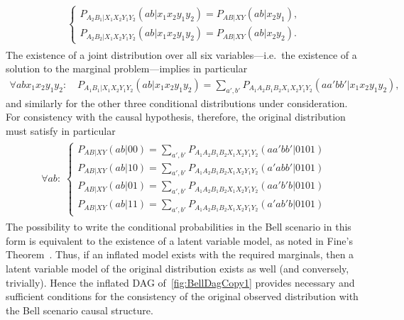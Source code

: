 {\begin{align}
\begin{split}
\begin{cases}
	P_{A_2 B_1 | X_1 X_2 Y_1 Y_2}(a b | x_1 x_2 y_1 y_2)  = P_{A B | X Y}(a b | x_2 y_1), \\
	P_{A_2 B_2 | X_1 X_2 Y_1 Y_2}(a b | x_1 x_2 y_1 y_2)  = P_{A B | X Y}(a b | x_2 y_2).
\end{cases}\end{split}\end{align}
The existence of a joint distribution over all six variables---i.e.~the existence of a solution to the marginal problem---implies in particular
\begin{align}
	\forall{a b x_1 x_2 y_1 y_2}: \quad P_{A_1 B_1 | X_1 X_2 Y_1 Y_2}(a b | x_1 x_2 y_1 y_2)  =  \sum\nolimits_{a',b'} P_{A_1 A_2 B_1 B_2 X_1 X_2 Y_1 Y_2}(a a' b b'|x_1 x_2 y_1 y_2),
\end{align}
and similarly for the other three conditional distributions under consideration. For consistency with the causal hypothesis, therefore, the original distribution must satisfy in particular
\begin{align}\begin{split}\label{eq:finalBellstep}\forall{a b}:\; \begin{cases}
	P_{A B | X Y}(a b | 0 0)  =  \sum\nolimits_{a',b'} P_{A_1 A_2 B_1 B_2 X_1 X_2 Y_1 Y_2}(a a' b b'|0101) \\
	P_{A B | X Y}(a b | 1 0)  =  \sum\nolimits_{a',b'} P_{A_1 A_2 B_1 B_2 X_1 X_2 Y_1 Y_2}(a' a b b'|0101) \\
	P_{A B | X Y}(a b | 0 1)  =  \sum\nolimits_{a',b'} P_{A_1 A_2 B_1 B_2 X_1 X_2 Y_1 Y_2}(a a' b' b|0101) \\
	P_{A B | X Y}(a b | 1 1)  =  \sum\nolimits_{a',b'} P_{A_1 A_2 B_1 B_2 X_1 X_2 Y_1 Y_2}(a' a b' b|0101)
\end{cases}\end{split}\end{align}
The possibility to write the conditional probabilities in the Bell scenario in this form is equivalent to the existence of a latent variable model, as noted in Fine's Theorem~\cite{FineTheorem}. Thus, if an inflated model exists with the required marginals, then a latent variable model of the original distribution exists as well (and conversely, trivially). Hence the inflated DAG of~\cref{fig:BellDagCopy1} provides necessary and sufficient conditions for the consistency of the original observed distribution with the Bell scenario causal structure.

}
